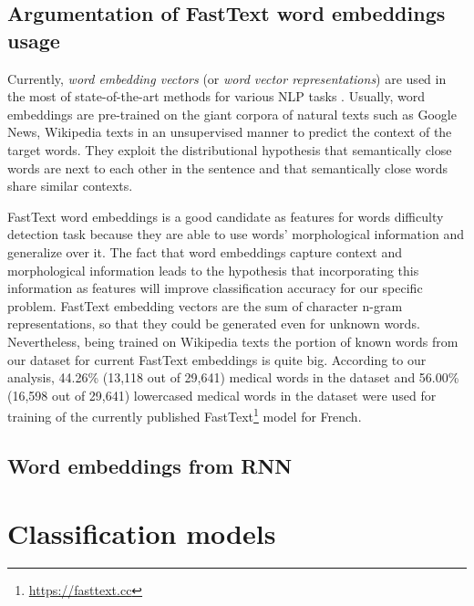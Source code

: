 \subsection{Argumentation of FastText word embeddings usage}
Currently, \textit{word embedding vectors} \citep{Mikolov-NIPS2013} (or \textit{word vector representations}) are used in the most of state-of-the-art methods for various NLP tasks \citep{NLPPROGRESS}. Usually, word embeddings are pre-trained on the giant corpora of natural texts such as Google News, Wikipedia texts in an unsupervised manner to predict the context of the target words. They exploit the distributional hypothesis that semantically close words are next to each other in the sentence and that semantically close words share similar contexts. 

FastText word embeddings \citep{Bojanowski-ARXIV2016} is a good candidate as features for words difficulty detection task because they are able to use words' morphological information and generalize over it. The fact that word embeddings capture context and morphological information leads to the hypothesis that incorporating this information as features will improve classification accuracy for our specific problem. FastText embedding vectors are the sum of character n-gram representations, so that they could be generated even for unknown words. Nevertheless, being trained on Wikipedia texts the portion of known words from our dataset for current FastText embeddings is quite big. According to our analysis, 44.26\% (13,118 out of 29,641) medical words in the dataset and 56.00\% (16,598 out of 29,641) lowercased medical words in the dataset were used for training of the currently published FastText\footnote{\url{https://fasttext.cc}} model for French.

\subsection{Word embeddings from RNN}


\section{Classification models}



